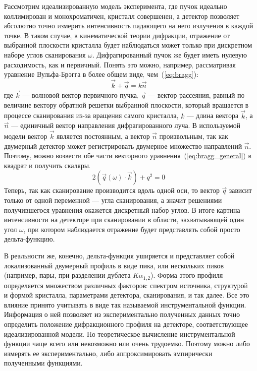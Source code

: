 Рассмотрим идеализированную модель эксперимента, где пучок идеально коллимирован и монохроматичен, кристалл совершенен, а детектор позволяет абсолютно точно измерить интенсивность падающего на него излучения в каждой точке.
В таком случае, в кинематической теории дифракции, отражение от выбранной плоскости кристалла будет наблюдаться может только при дискретном наборе углов сканирования $\omega$.
Дифрагированный пучок же будет иметь нулевую расходимость, как и первичный.
Понять это можно, например, рассматривая уравнение Вульфа-Брэгга в более общем виде, чем~(\ref{eq:bragg}):
\begin{equation} \label{eq:bragg_general}
    \vec{k} + \vec{q} = k \vec{n}
\end{equation}
где $\vec{k}$ --- волновой вектор первичного пучка, $\vec{q}$ --- вектор рассеяния, равный по величине вектору обратной решетки выбранной плоскости, который вращается в процессе сканирования из-за вращения самого кристалла, $k$ --- длина вектора $\vec{k}$, а $\vec{n}$ --- единичный вектор направления дифрагированного луча.
В используемой модели вектор $\vec{k}$ является постоянным, а вектор $\vec{n}$ произвольным, так как двумерный детектор может регистрировать двумерное множество направлений $\vec{n}$.
Поэтому, можно возвести обе части векторного уравнения~(\ref{eq:bragg_general}) в квадрат и получить скаляры.
\begin{equation} \label{eq:squared_bragg}
    2(\vec{q}(\omega) \cdot \vec{k}) + q^2 = 0
\end{equation}
Теперь, так как сканирование производится вдоль одной оси, то вектор $\vec{q}$ зависит только от одной переменной --- угла сканирования, а значит решениями получившегося уравнения окажется дискретный набор углов.
В итоге картина интенсивности на детекторе при сканировании в области, захватывающей один угол $\omega$, при котором наблюдается отражение будет представлять собой просто дельта-функцию.

В реальности же, конечно, дельта-функция уширяется и представляет собой локализованный двумерный профиль в виде пика, или нескольких пиков (например, пары, при разделении дублета $K\alpha_{1,2}$).
Форма этого профиля определяется множеством различных факторов: спектром источника, структурой и формой кристалла, параметрами детектора, сканирования, и так далее.
Все это влияние принято учитывать в виде так называемой инструментальной функции.
Информация о ней позволяет из экспериментально полученных данных точно определить положение дифракционного профиля на детекторе, соответствующее идеализированной модели.
Но теоретическое вычисление инструментальной функции чаще всего или невозможно или очень трудоемко.
Поэтому можно либо измерять ее экспериментально, либо аппроксимировать эмпирически полученными функциями.

